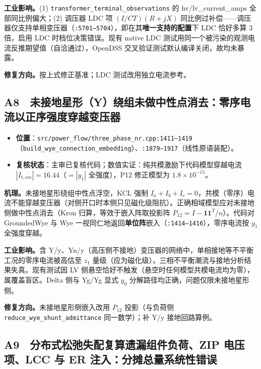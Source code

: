 \documentclass[11pt,a4paper,fontset=fandol]{ctexart}
\newcommand{\file}[1]{\texttt{#1}}
\begin{document}
\textbf{工业影响。}(1) \file{transformer\_terminal\_observations} 的 hv/lv\_current\_amps 全部同比例偏大；(2) 调压器 LDC 项 $(I/CT)(R+jX)$ 同比例过补偿——调压器仅支持单相变压器（\file{:5701--5704}），即在其\textbf{唯一支持的配置}下 LDC 恰好多算 3 倍，启用 LDC 时档位决策错误。现有 native LDC 测试用同一个被污染的观测电流反推期望值（自洽通过），OpenDSS 交叉验证测试默认编译关闭，故均未暴露。

\textbf{修复方向。}按上式修正基准；LDC 测试改用独立电流参考。

\subsection{A8　未接地星形（Y）绕组未做中性点消去：零序电流以正序强度穿越变压器}
\label{sec:a8}

\begin{itemize}
  \item \textbf{位置}：\file{src/power\_flow/three\_phase\_nr.cpp:1411--1419}（\file{build\_wye\_connection\_embedding}）、\file{:1879--1917}（线性原语装配）。
  \item \textbf{复核状态}：主审已复核代码；数值实证：纯共模激励下代码模型穿越电流 $|\!I_{t,cm}\!|=16.44$（$=|y_1|$ 全强度），P12 修正模型为 $1.8\times10^{-15}$。
\end{itemize}

\textbf{机理。}未接地星形绕组中性点浮空，KCL 强制 $I_a+I_b+I_c=0$，共模（零序）电流不能穿越变压器（对侧开口时本侧只见磁化级阻抗）。正确相域模型应对未接地侧做中性点消去（Kron 归算，等效于嵌入阵取投影阵 $P_{12}=I-\bm{1}\bm{1}^{T}/n$）。代码对 GroundedWye 与 Wye 一视同仁地返回\textbf{单位阵}嵌入（\file{:1414--1416}），零序电流按 $y_1$ 全强度穿越。

\textbf{工业影响。}含 Y/y、Yn/y（高压侧不接地）变压器的网络中，单相接地等不平衡工况的零序电流被高估至 $z_1$ 量级（应为磁化级），三相不平衡潮流与接地分析结果失真。现有测试因 LV 侧悬空恰好不触发（悬空时任何模型共模电流均为零），属覆盖盲区。Delta 侧与 Yg/Yg 显式 $y_0$ 分解路径均正确，问题仅限未接地星形侧。

\textbf{修复方向。}未接地星形侧嵌入改用 $P_{12}$ 投影（与负荷侧 \file{reduce\_wye\_shunt\_admittance} 同一数学）；补 Y/y 接地回路算例。

\subsection{A9　分布式松弛失配复算遗漏组件负荷、ZIP 电压项、LCC 与 ER 注入：分摊总量系统性错误}
\label{sec:a9}
\end{document}
